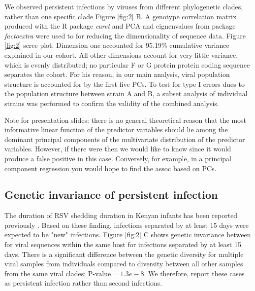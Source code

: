\documentclass{article}
\begin{document}
We observed persistent infections by viruses from different phylogenetic clades, rather than one specific clade 
Figure \ref{fig:2} B.
A genotype correlation matrix produced with the R package \textit{caret} and PCA and eignenvalues from package \textit{factoextra} were used to for reducing the dimensionality of sequence data.
Figure \ref{fig:2} scree plot.
Dimension one accounted for 95.19\% cumulative variance explained in our cohort.
All other dimensions account for very little variance, which is evenly distributed; no particular F or G protein protein coding sequence separates the cohort.
For his reason, in our main analysis, viral population structure is accounted for by the first five PCs. 
To test for type I errors dues to the population structure between strain A and B, 
a subset analysis of individual strains was performed to confirm the validity of the combined analysis.

Note for presentation slides: there is no general theoretical reason that the most informative linear function of the predictor variables should lie among the dominant principal components of the multivariate distribution of the predictor variables. However, if there were then we would like to know since it would produce a false positive in this case. Conversely, for example, in a principal component regression you would hope to find the assoc based on PCs.

\subsection{Genetic invariance of persistent infection}
The duration of RSV shedding duration in Kenyan infants has been reported previously
\cite{okiro2010duration}.
Based on these finding, infections separated by at least 15 days were expected to be "new" infections. 
Figure \ref{fig:2} C
shows genetic invariance between for viral sequences within the same host for infections separated by at least 15 days. 
There is a significant difference between the genetic diversity for multiple viral samples from individuals compared to diversity between all other samples from the same viral clades; $\text{P-value} = 1.3e-8$.
We therefore, report these cases as persistent infection rather than second infections.
\end{document}
